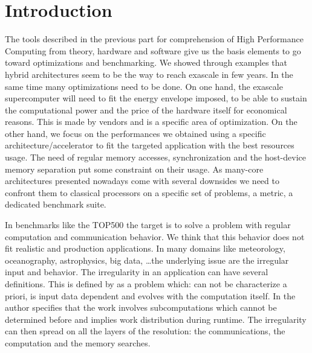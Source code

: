 
\chapter*{Introduction}

The tools described in the previous part for comprehension of High Performance Computing from theory, hardware and software give us the basis elements to go toward optimizations and benchmarking. 
We showed through examples that hybrid architectures seem to be the way to reach exascale in few years.
In the same time many optimizations need to be done.
On one hand, the exascale supercomputer will need to fit the energy envelope imposed, to be able to sustain the computational power and the price of the hardware itself for economical reasons.  
This is made by vendors and is a specific area of optimization.
On the other hand, we focus on the performances we obtained using a specific architecture/accelerator to fit the targeted application with the best resources usage. 
The need of regular memory accesses, synchronization and the host-device memory separation put some constraint on their usage.
As many-core architectures presented nowadays come with several downsides we need to confront them to classical processors on a specific set of problems, a metric, a dedicated benchmark suite.

In benchmarks like the TOP500 the target is to solve a problem with regular computation and communication behavior. 
We think that this behavior does not fit realistic and production applications.
In many domains like meteorology, oceanography, astrophysics, big data, \dots the underlying issue are the irregular input and behavior.
The irregularity in an application can have several definitions. 
This is defined by \cite{javairregular} as a problem which: can not be characterize a priori, is input data dependent and evolves with the computation itself. 
In \cite{suss2006implementing} the author specifies that the work involves subcomputations which cannot be determined before and implies work distribution during runtime.
The irregularity can then spread on all the layers of the resolution:
the communications, the computation and the memory searches. 

